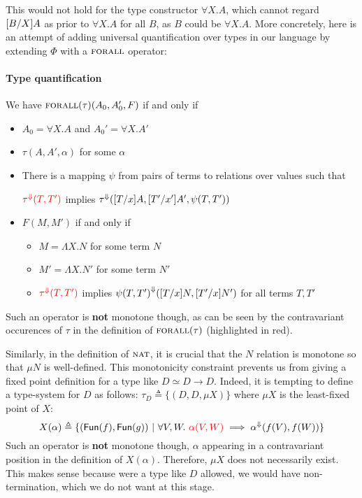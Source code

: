 \documentclass{article} \usepackage{chtt-notes} \usepackage{stmaryrd}
\newcommand{\lift}[1]{{#1}^{\Downarrow}}
\begin{document}
This would not hold for the type constructor $\forall X. A$, which
cannot regard $[B/X]A$ as prior to $\forall X. A$ for all
$B$, as $B$ could be $\forall X. A$. More concretely, here is an
attempt of adding universal quantification over types in our language
by extending $\Phi$ with a $\textsc{forall}$ operator:

\paragraph{Type quantification} 
We have $\textsc{forall}(\tau)(A_0, A'_0, F)$ if and only if
\begin{itemize}
\item $A_0 = \forall X. A$ and $A_0' = \forall X. A'$
\item $\tau(A, A', \alpha)$ for some $\alpha$
\item There is a mapping $\psi$ from pairs of terms to relations over
  values such that
  \begin{center}
    $\color{red}{\lift{\tau}(T, T')}$ implies
    $\lift{\tau}(\subst{T}{x}{A}, \subst{T'}{x'}{A'}, \psi(T, T'))$
  \end{center}
\item $F(M, M')$ if and only if
  \begin{itemize}
  \item $M = \Lambda X. N$ for some term $N$
  \item $M' = \Lambda X. N'$ for some term $N'$
  \item $\color{red}{\lift{\tau}(T, T')}$ implies
    $\lift{\psi(T, T')} (\subst{T}{x}{N}, \subst{T'}{x}{N'})$ for all
    terms $T, T'$
  \end{itemize}
\end{itemize}

Such an operator is \textbf{not} monotone though, as can be seen by
the contravariant occurences of $\tau$ in the definition of
$\textsc{forall}(\tau)$ (highlighted in red).

\bigskip

Similarly, in the definition of $\textsc{nat}$, it is crucial that the
$N$ relation is monotone so that $\mu N$ is well-defined.  This
monotonicity constraint prevents us from giving a fixed point
definition for a type like $D \simeq D \to D$. Indeed, it is tempting
to define a type-system for $D$ as follows:
$\tau_D \triangleq \{(D, D, \mu X)\}$ where $\mu X$ is the least-fixed
point of $X$:
\[ X(\alpha) \triangleq \{ (\textsf{Fun}(f), \textsf{Fun}(g)) \ | \
  \forall V, W. \ {\color{red}{\alpha(V, W)}} \implies
  \lift{\alpha}(f(V), f(W)) \} \] Such an operator is \textbf{not}
monotone though, $\alpha$ appearing in a contravariant position in the
definition of $X(\alpha)$. Therefore, $\mu X$ does not necessarily
exist. This makes sense because were a type like $D$ allowed, we would
have non-termination, which we do not want at this stage.


 
\end{document}
